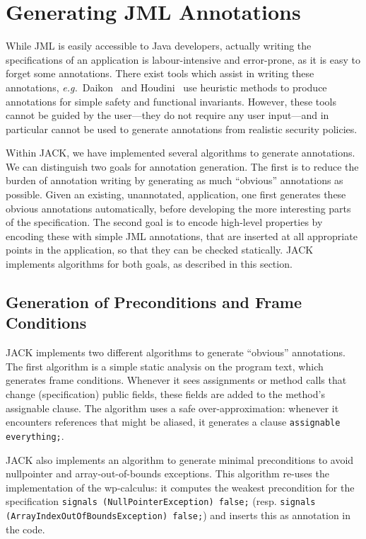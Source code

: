 
\section{Generating JML Annotations}\label{SecAnnotGen}

While JML is easily accessible to Java developers, actually writing
the specifications of an application is labour-intensive and
error-prone, as it is easy to forget some annotations. There exist
tools which assist in writing these annotations,
\emph{e.g.}~Daikon~\cite{ErnstCGN01} and Houdini~\cite{FlanaganL01}
use heuristic methods to produce annotations for simple safety and
functional invariants.  However, these tools cannot be guided by the
user---they do not require any user input---and in particular cannot
be used to generate annotations from realistic security policies.

Within JACK, we have implemented several algorithms to generate
annotations. We can distinguish two goals for annotation
generation. The first is to reduce the burden of annotation writing by
generating as much ``obvious'' annotations as possible. Given an
existing, unannotated, application, one first generates these obvious
annotations automatically, before developing the more interesting
parts of the specification. The second goal is to encode high-level
properties by encoding these with simple JML annotations, that are
inserted at all appropriate points in the application, so that they
can be checked statically.  JACK implements algorithms for both goals,
as described in this section.


\subsection{Generation of Preconditions and Frame Conditions}
JACK implements two different algorithms to generate ``obvious''
annotations. The first algorithm is a simple static analysis on the
program text, which generates frame conditions. Whenever it sees
assignments or method calls that change (specification) public fields,
these fields are added to the method's assignable clause. The
algorithm uses a safe over-approximation: whenever it encounters
references that might be aliased, it generates a clause
\texttt{assignable \bsl everything;}.

JACK also implements an algorithm to generate minimal preconditions to
avoid nullpointer and array-out-of-bounds exceptions. This algorithm
re-uses the implementation of the wp-calculus: it computes the weakest
precondition for the specification
\texttt{signals (NullPointerException) false;} (resp. \texttt{signals
(ArrayIndexOutOfBoundsException) false;}) and inserts this as 
annotation in the code.

